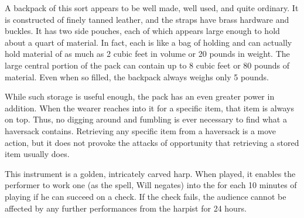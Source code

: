 {\begin{comment}
Stone Golem Manual, Greater} The book contains geas/quest, limited wish, polymorph any object, and slow. The reader may treat her caster level as three levels higher than normal for the purpose of crafting a stone golem. The book supplies 7,640 XP for the creation of a greater stone golem.

Strong abjuration and enchantment; CL 16th; Craft Construct, creator must be caster level 16th, antimagic field, geas/quest, symbol of stunning; Price 44,000 gp; Cost 2,900 gp \add 7,872 XP; Weight 5 lb.
\end{comment}

 A backpack of this sort appears to be well made, well used, and quite ordinary. It is constructed of finely tanned leather, and the straps have brass hardware and buckles. It has two side pouches, each of which appears large enough to hold about a quart of material. In fact, each is like a bag of holding and can actually hold material of as much as 2 cubic feet in volume or 20 pounds in weight. The large central portion of the pack can contain up to 8 cubic feet or 80 pounds of material. Even when so filled, the backpack always weighs only 5 pounds.

While such storage is useful enough, the pack has an even greater power in addition. When the wearer reaches into it for a specific item, that item is always on top. Thus, no digging around and fumbling is ever necessary to find what a haversack contains. Retrieving any specific item from a haversack is a move action, but it does not provoke the attacks of opportunity that retrieving a stored item usually does.


 This instrument is  a golden, intricately carved harp.  When played, it enables the performer to work one  (as the spell, Will negates) into the  for each 10 minutes of playing if he can succeed on a  check. If the check fails, the audience cannot be affected by any further performances from the harpist for 24 hours.

}
